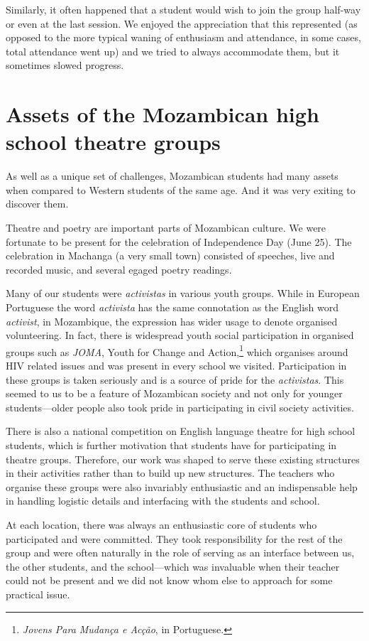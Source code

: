 \documentclass[article,twocolumn,twoside]{memoir}
\begin{document}
Similarly, it often happened that a student would wish to join the group
half-way or even at the last session. We enjoyed the appreciation that this
represented (as opposed to the more typical waning of enthusiasm and
attendance, in some cases, total attendance went up) and we tried to always
accommodate them, but it sometimes slowed progress.

\chapter{Assets of the Mozambican high school theatre groups}
As well as a unique set of challenges, Mozambican students had many assets when
compared to Western students of the same age. And it was very exiting to
discover them.

Theatre and poetry are important parts of Mozambican culture. We were fortunate
to be present for the celebration of Independence Day (June 25). The
celebration in Machanga (a very small town) consisted of speeches, live and
recorded music, and several egaged poetry readings.

Many of our students were \textit{activistas} in various youth groups. While in
European Portuguese the word \textit{activista} has the same connotation as the
English word \textit{activist}, in Mozambique, the expression has wider usage
to denote organised volunteering. In fact, there is widespread youth social
participation in organised groups such as \textit{JOMA}, Youth for Change and
Action,\footnote{\textit{Jovens Para Mudança e Acção}, in Portuguese.} which
organises around HIV related issues and was present in every school we visited.
Participation in these groups is taken seriously and is a source of pride for
the \textit{activistas}. This seemed to us to be a feature of Mozambican
society and not only for younger students---older people also took pride in
participating in civil society activities.

There is also a national competition on English language theatre for high
school students, which is further motivation that students have for
participating in theatre groups. Therefore, our work was shaped to serve these
existing structures in their activities rather than to build up new structures.
The teachers who organise these groups were also invariably enthusiastic and an
indispensable help in handling logistic details and interfacing with the
students and school.

At each location, there was always an enthusiastic core of students who
participated and were committed. They took responsibility for the rest of the
group and were often naturally in the role of serving as an interface between
us, the other students, and the school---which was invaluable when their
teacher could not be present and we did not know whom else to approach for some
practical issue.
\end{document}
